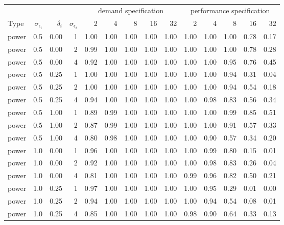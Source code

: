 \begin{table}[H]
\centering\begingroup\fontsize{8}{10}\selectfont

\begin{tabular}{lrrrrrrrrrrrrr}
\toprule
\multicolumn{4}{c}{ } & \multicolumn{5}{c}{demand specification} & \multicolumn{5}{c}{performance specification} \\
\cmidrule(l{3pt}r{3pt}){5-9} \cmidrule(l{3pt}r{3pt}){10-14}
Type & $\sigma_{\epsilon_i}$ & $\delta_i$ & $\sigma_{\epsilon_i}$ & 2 & 4 & 8 & 16 & 32 & 2 & 4 & 8 & 16 & 32\\
\midrule
power & 0.5 & 0.00 & 1 & 1.00 & 1.00 & 1.00 & 1.00 & 1.00 & 1.00 & 1.00 & 1.00 & 0.78 & 0.17\\
power & 0.5 & 0.00 & 2 & 0.99 & 1.00 & 1.00 & 1.00 & 1.00 & 1.00 & 1.00 & 1.00 & 0.78 & 0.28\\
power & 0.5 & 0.00 & 4 & 0.92 & 1.00 & 1.00 & 1.00 & 1.00 & 1.00 & 1.00 & 0.95 & 0.76 & 0.45\\
power & 0.5 & 0.25 & 1 & 1.00 & 1.00 & 1.00 & 1.00 & 1.00 & 1.00 & 1.00 & 0.94 & 0.31 & 0.04\\
power & 0.5 & 0.25 & 2 & 1.00 & 1.00 & 1.00 & 1.00 & 1.00 & 1.00 & 1.00 & 0.94 & 0.54 & 0.18\\
power & 0.5 & 0.25 & 4 & 0.94 & 1.00 & 1.00 & 1.00 & 1.00 & 1.00 & 0.98 & 0.83 & 0.56 & 0.34\\
power & 0.5 & 1.00 & 1 & 0.89 & 0.99 & 1.00 & 1.00 & 1.00 & 1.00 & 1.00 & 0.99 & 0.85 & 0.51\\
power & 0.5 & 1.00 & 2 & 0.87 & 0.99 & 1.00 & 1.00 & 1.00 & 1.00 & 1.00 & 0.91 & 0.57 & 0.33\\
power & 0.5 & 1.00 & 4 & 0.80 & 0.98 & 1.00 & 1.00 & 1.00 & 1.00 & 0.90 & 0.57 & 0.34 & 0.20\\
power & 1.0 & 0.00 & 1 & 0.96 & 1.00 & 1.00 & 1.00 & 1.00 & 1.00 & 0.99 & 0.80 & 0.15 & 0.01\\
power & 1.0 & 0.00 & 2 & 0.92 & 1.00 & 1.00 & 1.00 & 1.00 & 1.00 & 0.98 & 0.83 & 0.26 & 0.04\\
power & 1.0 & 0.00 & 4 & 0.81 & 1.00 & 1.00 & 1.00 & 1.00 & 0.99 & 0.96 & 0.82 & 0.50 & 0.21\\
power & 1.0 & 0.25 & 1 & 0.97 & 1.00 & 1.00 & 1.00 & 1.00 & 1.00 & 0.95 & 0.29 & 0.01 & 0.00\\
power & 1.0 & 0.25 & 2 & 0.94 & 1.00 & 1.00 & 1.00 & 1.00 & 1.00 & 0.94 & 0.54 & 0.08 & 0.01\\
power & 1.0 & 0.25 & 4 & 0.85 & 1.00 & 1.00 & 1.00 & 1.00 & 0.98 & 0.90 & 0.64 & 0.33 & 0.13\\

\end{tabular}
\end{table}
